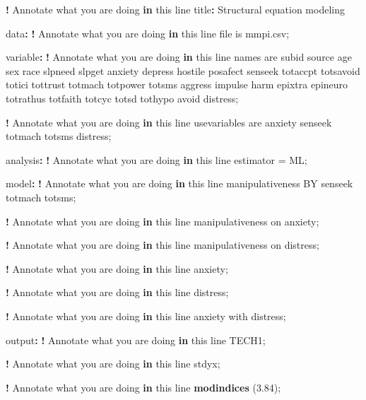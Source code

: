\documentclass[
]{book}
\newenvironment{Shaded}{\begin{snugshade}}{\end{snugshade}}
\newcommand{\ControlFlowTok}[1]{\textcolor[rgb]{0.13,0.29,0.53}{\textbf{#1}}}
\newcommand{\FloatTok}[1]{\textcolor[rgb]{0.00,0.00,0.81}{#1}}
\newcommand{\FunctionTok}[1]{\textcolor[rgb]{0.13,0.29,0.53}{\textbf{#1}}}
\newcommand{\NormalTok}[1]{#1}
\newcommand{\OtherTok}[1]{\textcolor[rgb]{0.56,0.35,0.01}{#1}}
\newcommand{\SpecialCharTok}[1]{\textcolor[rgb]{0.81,0.36,0.00}{\textbf{#1}}}
\begin{document}
\begin{Shaded}
\begin{Highlighting}[]
\SpecialCharTok{!}\NormalTok{ Annotate what you are doing }\ControlFlowTok{in}\NormalTok{ this line}
\NormalTok{title}\SpecialCharTok{:}\NormalTok{ Structural equation modeling}

\NormalTok{data}\SpecialCharTok{:}
\SpecialCharTok{!}\NormalTok{ Annotate what you are doing }\ControlFlowTok{in}\NormalTok{ this line}
\NormalTok{file is mmpi.csv;}

\NormalTok{variable}\SpecialCharTok{:}
\SpecialCharTok{!}\NormalTok{ Annotate what you are doing }\ControlFlowTok{in}\NormalTok{ this line}
\NormalTok{names are subid source age sex race slpneed slpget anxiety depress}
\NormalTok{hostile posafect senseek totaccpt totsavoid totici tottrust totmach}
\NormalTok{totpower totsms aggress impulse harm epixtra epineuro totrathus}
\NormalTok{totfaith totcyc totsd tothypo avoid distress;}

\SpecialCharTok{!}\NormalTok{ Annotate what you are doing }\ControlFlowTok{in}\NormalTok{ this line}
\NormalTok{usevariables are anxiety senseek totmach totsms distress;}

\NormalTok{analysis}\SpecialCharTok{:}
\SpecialCharTok{!}\NormalTok{ Annotate what you are doing }\ControlFlowTok{in}\NormalTok{ this line}
\NormalTok{estimator }\OtherTok{=}\NormalTok{ ML;}

\NormalTok{model}\SpecialCharTok{:}
\SpecialCharTok{!}\NormalTok{ Annotate what you are doing }\ControlFlowTok{in}\NormalTok{ this line}
\NormalTok{manipulativeness BY senseek totmach totsms;}

\SpecialCharTok{!}\NormalTok{ Annotate what you are doing }\ControlFlowTok{in}\NormalTok{ this line}
\NormalTok{manipulativeness on anxiety;}

\SpecialCharTok{!}\NormalTok{ Annotate what you are doing }\ControlFlowTok{in}\NormalTok{ this line}
\NormalTok{manipulativeness on distress;}

\SpecialCharTok{!}\NormalTok{ Annotate what you are doing }\ControlFlowTok{in}\NormalTok{ this line}
\NormalTok{anxiety;}

\SpecialCharTok{!}\NormalTok{ Annotate what you are doing }\ControlFlowTok{in}\NormalTok{ this line}
\NormalTok{distress;}

\SpecialCharTok{!}\NormalTok{ Annotate what you are doing }\ControlFlowTok{in}\NormalTok{ this line}
\NormalTok{anxiety with distress;}

\NormalTok{output}\SpecialCharTok{:}
\SpecialCharTok{!}\NormalTok{ Annotate what you are doing }\ControlFlowTok{in}\NormalTok{ this line}
\NormalTok{TECH1;}

\SpecialCharTok{!}\NormalTok{ Annotate what you are doing }\ControlFlowTok{in}\NormalTok{ this line}
\NormalTok{stdyx;}

\SpecialCharTok{!}\NormalTok{ Annotate what you are doing }\ControlFlowTok{in}\NormalTok{ this line}
\FunctionTok{modindices}\NormalTok{ (}\FloatTok{3.84}\NormalTok{);}
\end{Highlighting}
\end{Shaded}
\end{document}
